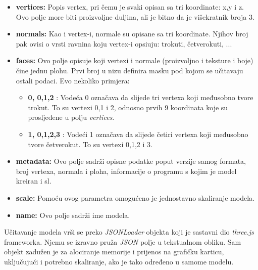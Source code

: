 \begin{itemize}
\item \textbf{vertices:} Popis vertex, pri čemu je svaki opisan sa tri koordinate: x,y i z. Ovo polje more biti proizvoljne duljina, ali je bitno da je višekratnik broja 3.

\item \textbf{normals:} Kao i vertex-i, normale su opisane sa tri koordinate. Njihov broj pak ovisi o vrsti ravnina koju vertex-i opsiuju: trokuti, četverokuti, ...

\item \textbf{faces:} Ovo polje opisuje koji vertexi i normale (proizvoljno i teksture i boje) čine jednu plohu. Prvi broj u nizu definira masku pod kojom se učitavaju ostali podaci. Evo nekoliko primjera:

\begin{itemize}

\item \textbf{0, 0,1,2} : Vodeća 0 označava da slijede tri vertexa koji međusobno tvore trokut. To su vertexi 0,1 i 2, odnosno prvih 9 koordinata koje su prosljeđene u polju \emph{vertices}.

\item \textbf{1, 0,1,2,3} : Vodeći 1 označava da slijede četiri vertexa koji međusobno tvore četverokut. To su vertexi 0,1,2 i 3.
\end{itemize}

\item \textbf{metadata:} Ovo polje sadrži opisne podatke poput verzije samog formata, broj vertexa, normala i ploha, informacije o programu s kojim je model kreiran i sl.

\item \textbf{scale:} Pomoću ovog parametra omogućeno je jednostavno skaliranje modela.

\item \textbf{name:} Ovo polje sadrži ime modela.

\end{itemize}

Učitavanje modela vrši se preko \emph{JSONLoader} objekta koji je sastavni dio \emph{three.js} frameworka. Njemu se izravno pruža \emph{JSON} polje u tekstualnom obliku. Sam objekt zadužen je za alociranje memorije i prijenos na grafičku karticu, uključujući i potrebno skaliranje, ako je tako određeno u samome modelu.